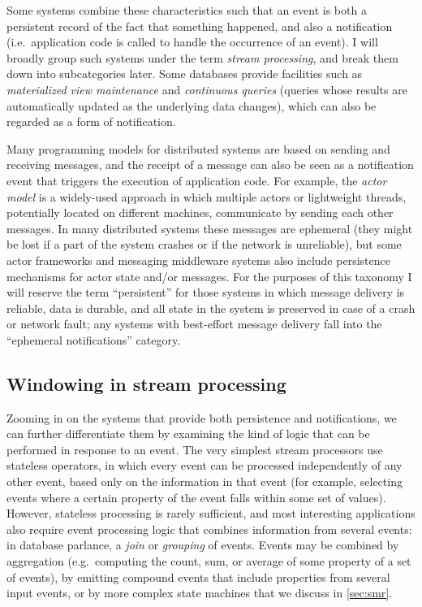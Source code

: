 \documentclass[sigconf,nonacm]{acmart}
\begin{document}
Some systems combine these characteristics such that an event is both a persistent record of the fact that something happened, and also a notification (i.e.\ application code is called to handle the occurrence of an event).
I will broadly group such systems under the term \emph{stream processing}, and break them down into subcategories later.
Some databases provide facilities such as \emph{materialized view maintenance} and \emph{continuous queries} (queries whose results are automatically updated as the underlying data changes), which can also be regarded as a form of notification.

Many programming models for distributed systems are based on sending and receiving messages, and the receipt of a message can also be seen as a notification event that triggers the execution of application code.
For example, the \emph{actor model} is a widely-used approach in which multiple actors or lightweight threads, potentially located on different machines, communicate by sending each other messages.
In many distributed systems these messages are ephemeral (they might be lost if a part of the system crashes or if the network is unreliable), but some actor frameworks and messaging middleware systems also include persistence mechanisms for actor state and/or messages.
For the purposes of this taxonomy I will reserve the term ``persistent'' for those systems in which message delivery is reliable, data is durable, and all state in the system is preserved in case of a crash or network fault; any systems with best-effort message delivery fall into the ``ephemeral notifications'' category.

\subsection{Windowing in stream processing}\label{sec:windowing}

Zooming in on the systems that provide both persistence and notifications, we can further differentiate them by examining the kind of logic that can be performed in response to an event.
The very simplest stream processors use stateless operators, in which every event can be processed independently of any other event, based only on the information in that event (for example, selecting events where a certain property of the event falls within some set of values).
However, stateless processing is rarely sufficient, and most interesting applications also require event processing logic that combines information from several events: in database parlance, a \emph{join} or \emph{grouping} of events.
Events may be combined by aggregation (e.g.\ computing the count, sum, or average of some property of a set of events), by emitting compound events that include properties from several input events, or by more complex state machines that we discuss in \autoref{sec:smr}.
\end{document}
